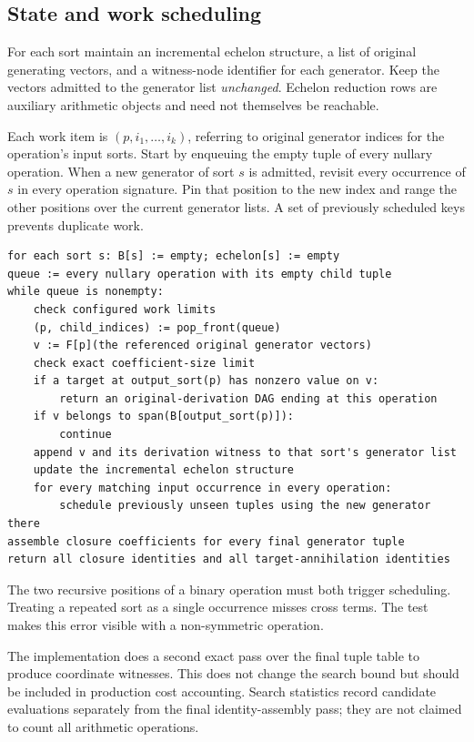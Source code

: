 \documentclass[11pt,letterpaper]{article}
\theoremstyle{definition}\newtheorem{definition}[theorem]{Definition}
\theoremstyle{remark}\newtheorem{remark}[theorem]{Remark}
\newcommand{\code}[1]{\texttt{\detokenize{#1}}}
\begin{document}
\subsection{State and work scheduling}
For each sort maintain an incremental echelon structure, a list of original generating vectors, and a witness-node identifier for each generator. Keep the vectors admitted to the generator list \emph{unchanged}. Echelon reduction rows are auxiliary arithmetic objects and need not themselves be reachable.

Each work item is $(p,i_1,\ldots,i_k)$, referring to original generator indices for the operation's input sorts. Start by enqueuing the empty tuple of every nullary operation. When a new generator of sort $s$ is admitted, revisit every occurrence of $s$ in every operation signature. Pin that position to the new index and range the other positions over the current generator lists. A set of previously scheduled keys prevents duplicate work.

\begin{lstlisting}
for each sort s: B[s] := empty; echelon[s] := empty
queue := every nullary operation with its empty child tuple
while queue is nonempty:
    check configured work limits
    (p, child_indices) := pop_front(queue)
    v := F[p](the referenced original generator vectors)
    check exact coefficient-size limit
    if a target at output_sort(p) has nonzero value on v:
        return an original-derivation DAG ending at this operation
    if v belongs to span(B[output_sort(p)]):
        continue
    append v and its derivation witness to that sort's generator list
    update the incremental echelon structure
    for every matching input occurrence in every operation:
        schedule previously unseen tuples using the new generator there
assemble closure coefficients for every final generator tuple
return all closure identities and all target-annihilation identities
\end{lstlisting}

The two recursive positions of a binary operation must both trigger scheduling. Treating a repeated sort as a single occurrence misses cross terms. The \code{slot_sensitive} test makes this error visible with a non-symmetric operation.

The implementation does a second exact pass over the final tuple table to produce coordinate witnesses. This does not change the search bound but should be included in production cost accounting. Search statistics record candidate evaluations separately from the final identity-assembly pass; they are not claimed to count all arithmetic operations.
\end{document}
